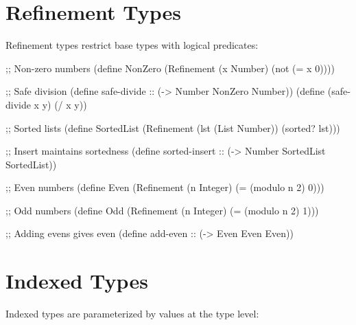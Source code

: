 \section{Refinement Types}
\label{sec:refinement-types}


Refinement types restrict base types with logical predicates:

\begin{grammar}
\end{grammar}

\begin{example}
\begin{lambdustcode}
;; Non-zero numbers
(define NonZero (Refinement (x Number) (not (= x 0))))

;; Safe division
(define safe-divide :: (-> Number NonZero Number))
(define (safe-divide x y) (/ x y))

;; Sorted lists  
(define SortedList 
  (Refinement (lst (List Number)) 
              (sorted? lst)))

;; Insert maintains sortedness
(define sorted-insert :: (-> Number SortedList SortedList))

;; Even numbers
(define Even (Refinement (n Integer) (= (modulo n 2) 0)))

;; Odd numbers  
(define Odd (Refinement (n Integer) (= (modulo n 2) 1)))

;; Adding evens gives even
(define add-even :: (-> Even Even Even))
\end{lambdustcode}
\end{example}

\section{Indexed Types}
\label{sec:indexed-types}


Indexed types are parameterized by values at the type level:

